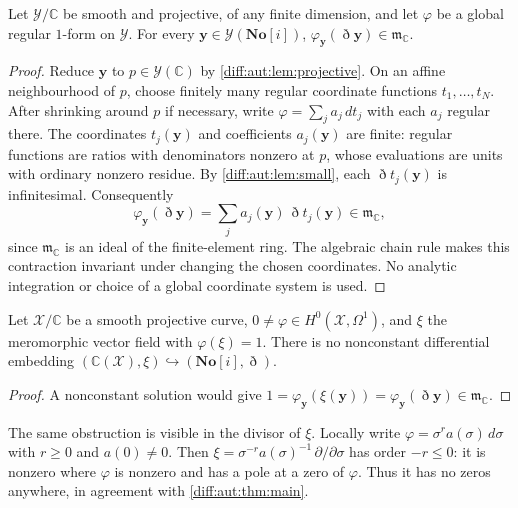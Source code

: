 \documentclass[11pt,letterpaper]{article}
\numberwithin{equation}{section}
\theoremstyle{definition}
\theoremstyle{remark}
\newcommand{\SC}{\mathbf{No}[i]}
\newcommand{\C}{\mathbb C}
\newcommand{\mm}{\mathfrak m}
\newcommand{\Dn}{\eth}
\begin{document}
\begin{proposition}
\label{diff:aut:prop:contraction}
Let $\mathcal Y/\C$ be smooth and projective, of any finite dimension, and let
$\varphi$ be a global regular $1$-form on $\mathcal Y$. For every
$\mathbf y\in\mathcal Y(\SC)$, $\varphi_{\mathbf y}(\Dn\mathbf y)\in\mm_{\C}$.
\end{proposition}
\begin{proof}
Reduce $\mathbf y$ to $p\in\mathcal Y(\C)$ by
\cref{diff:aut:lem:projective}. On an affine neighbourhood of $p$,
choose finitely many regular coordinate functions $t_1,\ldots,t_N$.
After shrinking around $p$ if necessary, write
$\varphi=\sum_j a_j\,dt_j$ with each $a_j$ regular there.
The coordinates $t_j(\mathbf y)$ and coefficients $a_j(\mathbf y)$
are finite: regular functions are ratios with denominators nonzero
at $p$, whose evaluations are units with ordinary nonzero residue.
By \cref{diff:aut:lem:small}, each
$\Dn t_j(\mathbf y)$ is infinitesimal. Consequently
\[
 \varphi_{\mathbf y}(\Dn\mathbf y)
 =\sum_j a_j(\mathbf y)\,\Dn t_j(\mathbf y)\in\mm_\C,
\]
since $\mm_\C$ is an ideal of the finite-element ring.
The algebraic chain rule makes this contraction invariant under
changing the chosen coordinates. No analytic integration or
choice of a global coordinate system is used.
\end{proof}

\begin{corollary}
\label{diff:aut:cor:dual}
Let $\mathcal X/\C$ be a smooth projective curve, $0\neq\varphi\in H^{0}(\mathcal X,\Omega^{1})$,
and $\xi$ the meromorphic vector field with $\varphi(\xi)=1$. There is no
nonconstant differential embedding $(\C(\mathcal X),\xi)\hookrightarrow(\SC,\Dn)$.
\end{corollary}
\begin{proof}
A nonconstant solution would give
$1=\varphi_{\mathbf y}(\xi(\mathbf y))=\varphi_{\mathbf y}(\Dn\mathbf y)\in\mm_{\C}$.
\end{proof}

The same obstruction is visible in the divisor of $\xi$.
Locally write $\varphi=\sigma^r a(\sigma)\,d\sigma$ with
$r\geq0$ and $a(0)\neq0$. Then
$\xi=\sigma^{-r}a(\sigma)^{-1}\,\partial/\partial\sigma$ has
order $-r\leq0$: it is nonzero where $\varphi$ is nonzero and
has a pole at a zero of $\varphi$. Thus it has no zeros anywhere,
in agreement with \cref{diff:aut:thm:main}.
\end{document}
